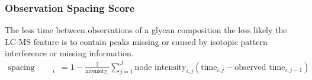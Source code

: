 \documentclass{article}
\begin{document}
\subsubsection{Observation Spacing Score}
The less time between observations of a glycan composition the less likely the LC-MS feature
is to contain peaks missing or caused by isotopic pattern interference or missing information.
\begin{align}
    \text{spacing score}_i &= 1 - \frac{2}{\text{intensity}_i}\sum_{j=1}^J\text{node intensity}_{i, j}(
        \text{time}_{i, j} - \text{observed time}_{i, j - 1})
\end{align}



\end{document}
